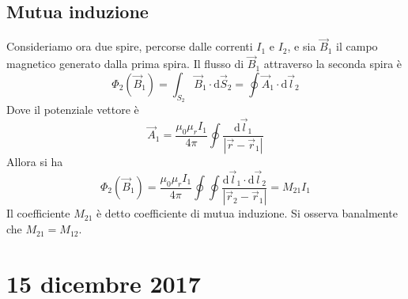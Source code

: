 \documentclass[a4paper,11pt]{book}
\newcommand{\dif}{\mathrm{d}}
\theoremstyle{definition}
\theoremstyle{theorem}
\begin{document}
\subsection{Mutua induzione}
Consideriamo ora due spire, percorse dalle correnti $I_1$ e $I_2$, e sia $\vec{B}_1$ il campo magnetico generato dalla prima spira. Il flusso di $\vec{B}_1$ attraverso la seconda spira è
\[\Phi_2(\vec{B}_1)=\int_{S_2}\vec{B}_1\cdot\dif\vec{S}_2=\oint\vec{A}_1\cdot\dif\vec{l}_2\]
Dove il potenziale vettore è
\[\vec{A}_1=\frac{\mu_0\mu_rI_1}{4\pi}\oint\frac{\dif\vec{l}_1}{|\vec{r}-\vec{r}_1|}\]
Allora si ha
\[\Phi_2(\vec{B}_1)=\frac{\mu_0\mu_rI_1}{4\pi}\oint\oint\frac{\dif\vec{l}_1\cdot\dif\vec{l}_2}{|\vec{r}_2-\vec{r}_1|}=M_{21}I_1\]
Il coefficiente $M_{21}$ è detto coefficiente di mutua induzione. Si osserva banalmente che $M_{21}=M_{12}$.
\section{15 dicembre 2017}
\end{document}
